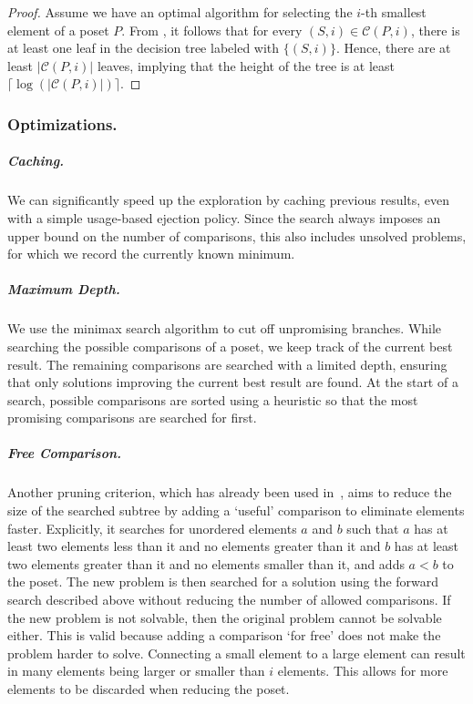 \documentclass[a4paper,UKenglish,cleveref, autoref, thm-restate]{lipics-v2021}
\begin{document}
\begin{proof}
  Assume we have an optimal algorithm for selecting the $i$-th smallest element of a poset $P$.
  From , it follows that for every $(S, i) \in \mathcal{C}(P, i)$, there is at least one leaf in the decision tree labeled with $\{(S, i)\}$.
  Hence, there are at least $|\mathcal{C}(P, i)|$ leaves, implying that the height of the tree is at least $\lceil\log(|\mathcal{C}(P, i)|)\rceil$.
\end{proof}

\subsubsection{Optimizations.}

\subparagraph{Caching.}
We can significantly speed up the exploration by caching previous results, even with a simple usage-based ejection policy.
Since the search always imposes an upper bound on the number of comparisons, this also includes unsolved problems, for which we record the currently known minimum.

\subparagraph{Maximum Depth.}
We use the minimax search algorithm to cut off unpromising branches.
While searching the possible comparisons of a poset, we keep track of the current best result.
The remaining comparisons are searched with a limited depth, ensuring that only solutions improving the current best result are found.
At the start of a search, possible comparisons are sorted using a heuristic so that the most promising comparisons are searched for first.

\subparagraph{Free Comparison.}
Another pruning criterion, which has already been used in~\cite{Oksanen}, aims to reduce the size of the searched subtree by adding a `useful' comparison to eliminate elements faster.
Explicitly, it searches for unordered elements $a$ and $b$ such that $a$ has at least two elements less than it and no elements greater than it and $b$ has at least two elements greater than it and no elements smaller than it, and adds $a < b$ to the poset.
The new problem is then searched for a solution using the forward search described above without reducing the number of allowed comparisons.
If the new problem is not solvable, then the original problem cannot be solvable either.
This is valid because adding a comparison `for free' does not make the problem harder to solve.
Connecting a small element to a large element can result in many elements being larger or smaller than $i$ elements.
This allows for more elements to be discarded when reducing the poset.
\end{document}
